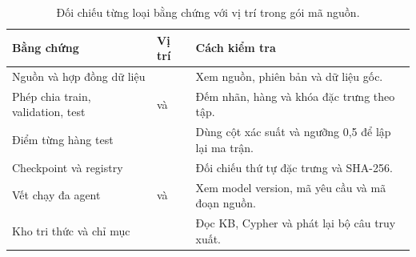 \par\FloatBarrier\begin{table}[H]\centering\small{}\setlength{\tabcolsep}{5pt}
\caption{Đối chiếu từng loại bằng chứng với vị trí trong gói mã nguồn.}\begin{tabular}{P{4.4cm}P{5.2cm}P{4.7cm}}\toprule
Bằng chứng & Vị trí & Cách kiểm tra\\\midrule
Nguồn và hợp đồng dữ liệu &  & Xem nguồn, phiên bản và dữ liệu gốc.\\
Phép chia train, validation, test &  và  & Đếm nhãn, hàng và khóa đặc trưng theo tập.\\
Điểm từng hàng test &  & Dùng cột xác suất và ngưỡng 0,5 để lập lại ma trận.\\
Checkpoint và registry &  & Đối chiếu thứ tự đặc trưng và SHA-256.\\
Vết chạy đa agent &  và  & Xem model version, mã yêu cầu và mã đoạn nguồn.\\
Kho tri thức và chỉ mục &  & Đọc KB, Cypher và phát lại bộ câu truy xuất.\\\bottomrule\end{tabular}\end{table}
